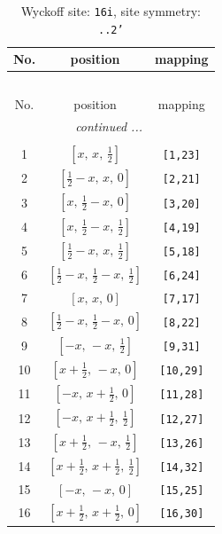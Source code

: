 \documentclass[fleqn,8pt]{jsarticle}
\begin{document}
\begin{longtable}{ccc}
\caption{Wyckoff site: {\tt 16i}, site symmetry: {\tt ..2'}}
 \\
 \hline \hline
No. & position & mapping \\ \hline \endfirsthead

\multicolumn{2}{l}{\tablename\ \thetable{}} \\
 \hline \hline
No. & position & mapping \\ \hline \endhead

 \hline \hline
\multicolumn{2}{r}{\footnotesize\it continued ...} \\ \endfoot

 \hline \hline
\multicolumn{2}{r}{} \\ \endlastfoot

1 & $\left[ x,\, x,\, \frac{1}{2} \right]$ & {\tt [1,23]} \\ \hline
2 & $\left[ \frac{1}{2} - x,\, x,\, 0 \right]$ & {\tt [2,21]} \\ \hline
3 & $\left[ x,\, \frac{1}{2} - x,\, 0 \right]$ & {\tt [3,20]} \\ \hline
4 & $\left[ x,\, \frac{1}{2} - x,\, \frac{1}{2} \right]$ & {\tt [4,19]} \\ \hline
5 & $\left[ \frac{1}{2} - x,\, x,\, \frac{1}{2} \right]$ & {\tt [5,18]} \\ \hline
6 & $\left[ \frac{1}{2} - x,\, \frac{1}{2} - x,\, \frac{1}{2} \right]$ & {\tt [6,24]} \\ \hline
7 & $\left[ x,\, x,\, 0 \right]$ & {\tt [7,17]} \\ \hline
8 & $\left[ \frac{1}{2} - x,\, \frac{1}{2} - x,\, 0 \right]$ & {\tt [8,22]} \\ \hline
9 & $\left[ - x,\, - x,\, \frac{1}{2} \right]$ & {\tt [9,31]} \\ \hline
10 & $\left[ x + \frac{1}{2},\, - x,\, 0 \right]$ & {\tt [10,29]} \\ \hline
11 & $\left[ - x,\, x + \frac{1}{2},\, 0 \right]$ & {\tt [11,28]} \\ \hline
12 & $\left[ - x,\, x + \frac{1}{2},\, \frac{1}{2} \right]$ & {\tt [12,27]} \\ \hline
13 & $\left[ x + \frac{1}{2},\, - x,\, \frac{1}{2} \right]$ & {\tt [13,26]} \\ \hline
14 & $\left[ x + \frac{1}{2},\, x + \frac{1}{2},\, \frac{1}{2} \right]$ & {\tt [14,32]} \\ \hline
15 & $\left[ - x,\, - x,\, 0 \right]$ & {\tt [15,25]} \\ \hline
16 & $\left[ x + \frac{1}{2},\, x + \frac{1}{2},\, 0 \right]$ & {\tt [16,30]} \\
\end{longtable}
\end{document}
